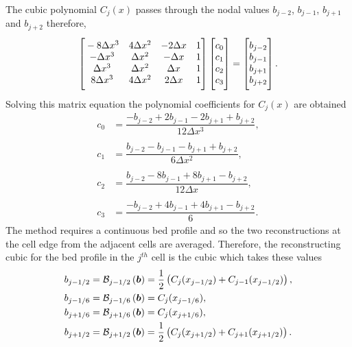 The cubic polynomial $C_j(x)$ passes through the nodal values $b_{j-2}$, $b_{j-1}$, $b_{j+1}$ and $b_{j+2}$ therefore,
\begin{equation*}
\begin{bmatrix}
\TM -8\Delta x^3 & 4\Delta x^2  & -2\Delta x & 1\\
-\Delta x^3 & \Delta x^2  &-\Delta x & 1\\
\Delta x^3 & \Delta x^2  & \Delta x & 1\\
8\Delta x^3 & 4\Delta x^2  & 2\Delta x & 1 \BM 
\end{bmatrix}
\begin{bmatrix}
 \TM c_0 \\ c_1 \\ c_2 \\ c_3  \BM\end{bmatrix} =  \begin{bmatrix}
 \TM b_{j-2} \\ b_{j-1}\\ b_{j+1} \\ b_{j+2} \BM
\end{bmatrix}.
\end{equation*}
Solving this matrix equation the polynomial coefficients for $C_j(x)$ are obtained
\begin{align*}
c_0 &=  \dfrac{-b_{j-2} + 2b_{j-1} - 2 b_{j+1} + b_{j+2}}{12 \Delta x^3},\\ \\
c_1 &=  \dfrac{b_{j-2} - b_{j-1} - b_{j+1} + b_{j+2}}{6 \Delta x^2},\\ \\
c_2 &=  \dfrac{b_{j-2} - 8b_{j-1} + 8 b_{j+1} - b_{j+2}}{12 \Delta x},\\ \\
c_3 &=  \dfrac{-b_{j-2}  + 4b_{j-1} + 4 b_{j+1} - b_{j+2}}{6}.
\end{align*}
The method requires a continuous bed profile and so the two reconstructions at the cell edge from the adjacent cells are averaged. Therefore, the reconstructing cubic for the bed profile in the $j^{th}$ cell is the cubic which takes these values
\begin{subequations}
\begin{align}
b_{j-1/2} &=  \mathcal{B}_{j-1/2}\left(\boldsymbol{b}\right) =  \frac{1}{2}\left( C_j(x_{j-1/2}) + C_{j-1}(x_{j-1/2})\right),\\
b_{j-1/6} &=  \mathcal{B}_{j-1/6}\left(\boldsymbol{b}\right) =  C_j(x_{j-1/6}),\\
b_{j+1/6} &=  \mathcal{B}_{j+1/6}\left(\boldsymbol{b}\right) =  C_j(x_{j+1/6}),\\
b_{j+1/2} &=  \mathcal{B}_{j+1/2}\left(\boldsymbol{b}\right) =  \frac{1}{2}\left( C_j(x_{j+1/2}) + C_{j+1}(x_{j+1/2})\right).
\end{align}
\label{eqn:BedReconDef}
\end{subequations}



